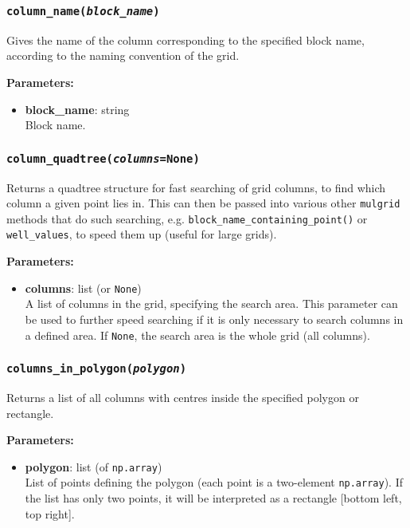 \subsubsection{\texttt{column\_name(\emph{block\_name})}}

Gives the name of the column corresponding to the specified block name, according to the naming convention of the grid.

\textbf{Parameters:}
\begin{itemize}
\item \textbf{block\_name}: string\\
  Block name.
\end{itemize}

\subsubsection{\texttt{column\_quadtree(\emph{columns}=None)}}

Returns a quadtree structure for fast searching of grid columns, to find which column a given point lies in.  This can then be passed into various other \texttt{mulgrid} methods that do such searching, e.g. \texttt{block\_name\_containing\_point()} or \texttt{well\_values}, to speed them up (useful for large grids).

\textbf{Parameters:}
\begin{itemize}
\item \textbf{columns}: list (or \texttt{None})\\
  A list of columns in the grid, specifying the search area.  This parameter can be used to further speed searching if it is only necessary to search columns in a defined area.  If \texttt{None}, the search area is the whole grid (all columns).
\end{itemize}

\subsubsection{\texttt{columns\_in\_polygon(\emph{polygon})}}

Returns a list of all columns with centres inside the specified polygon or rectangle.

\textbf{Parameters:}
\begin{itemize}
\item \textbf{polygon}: list (of \texttt{np.array})\\
  List of points defining the polygon (each point is a two-element \texttt{np.array}).  If the list has only two points, it will be interpreted as a rectangle [bottom left, top right].
\end{itemize}

